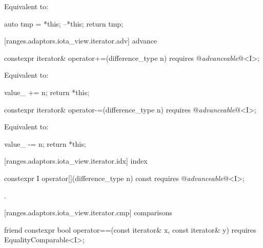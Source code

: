 \begin{itemdescr}
\pnum
\effects Equivalent to:
\begin{codeblock}
auto tmp = *this;
--*this;
return tmp;
\end{codeblock}
\end{itemdescr}

[ranges.adaptors.iota_view.iterator.adv]{ advance}

\begin{itemdecl}
constexpr iterator& operator+=(difference_type n)
requires @\textit{advanceable}@<I>;
\end{itemdecl}

\begin{itemdescr}
\pnum
\effects Equivalent to:
\begin{codeblock}
value_ += n;
return *this;
\end{codeblock}
\end{itemdescr}

\begin{itemdecl}
constexpr iterator& operator-=(difference_type n)
requires @\textit{advanceable}@<I>;
\end{itemdecl}

\begin{itemdescr}
\pnum
\effects Equivalent to:
\begin{codeblock}
value_ -= n;
return *this;
\end{codeblock}
\end{itemdescr}

[ranges.adaptors.iota_view.iterator.idx]{ index}

\begin{itemdecl}
constexpr I operator[](difference_type n) const
requires @\textit{advanceable}@<I>;
\end{itemdecl}

\begin{itemdescr}
\pnum
\returns {}.
\end{itemdescr}

[ranges.adaptors.iota_view.iterator.cmp]{ comparisons}

\begin{itemdecl}
friend constexpr bool operator==(const iterator& x, const iterator& y)
requires EqualityComparable<I>;
\end{itemdecl}


